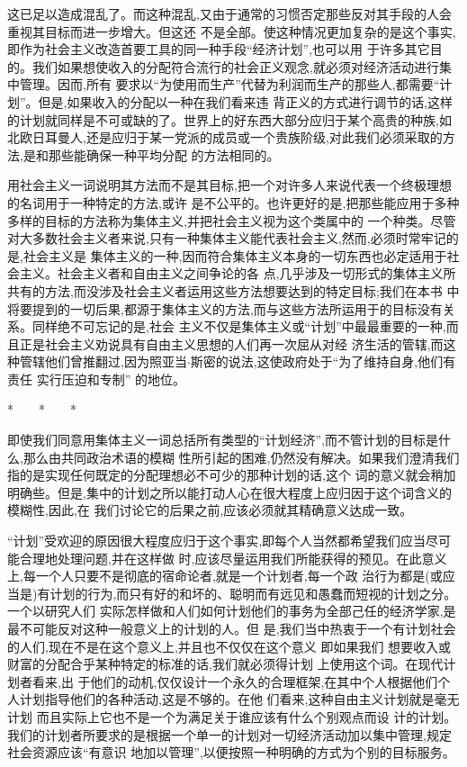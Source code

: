 ﻿\documentclass[12pt]{article}
\begin{document}
这已足以造成混乱了。而这种混乱,又由于通常的习惯否定那些反对其手段的人会重视其目标而进一步增大。但这还
不是全部。使这种情况更加复杂的是这个事实,即作为社会主义改造首要工具的同一种手段``经济计划'',也可以用
于许多其它目的。我们如果想使收入的分配符合流行的社会正义观念,就必须对经济活动进行集中管理。因而,所有
要求以``为使用而生产''代替为利润而生产的那些人,都需要``计划''。但是,如果收入的分配以一种在我们看来违
背正义的方式进行调节的话,这样的计划就同样是不可或缺的了。世界上的好东西大部分应归于某个高贵的种族,如
北欧日耳曼人,还是应归于某一党派的成员或一个贵族阶级,对此我们必须采取的方法,是和那些能确保一种平均分配
的方法相同的。

用社会主义一词说明其方法而不是其目标,把一个对许多人来说代表一个终极理想的名词用于一种特定的方法,或许
是不公平的。也许更好的是,把那些能应用于多种多样的目标的方法称为集体主义,并把社会主义视为这个类属中的
一个种类。尽管对大多数社会主义者来说,只有一种集体主义能代表社会主义,然而,必须时常牢记的是,社会主义是
集体主义的一种,因而符合集体主义本身的一切东西也必定适用于社会主义。社会主义者和自由主义之间争论的各
点,几乎涉及一切形式的集体主义所共有的方法,而没涉及社会主义者运用这些方法想要达到的特定目标;我们在本书
中将要提到的一切后果,都源于集体主义的方法,而与这些方法所运用于的目标没有关系。同样绝不可忘记的是,社会
主义不仅是集体主义或``计划''中最最重要的一种,而且正是社会主义劝说具有自由主义思想的人们再一次屈从对经
济生活的管辖,而这种管辖他们曾推翻过,因为照亚当$\cdot$斯密的说法,这使政府处于``为了维持自身,他们有责任
实行压迫和专制'' 的地位。

*　　*　　*

即使我们同意用集体主义一词总括所有类型的``计划经济'',而不管计划的目标是什么,那么由共同政治术语的模糊
性所引起的困难,仍然没有解决。如果我们澄清我们指的是实现任何既定的分配理想必不可少的那种计划的话,这个
词的意义就会稍加明确些。但是,集中的计划之所以能打动人心在很大程度上应归因于这个词含义的模糊性,因此,在
我们讨论它的后果之前,应该必须就其精确意义达成一致。

``计划''受欢迎的原因很大程度应归于这个事实,即每个人当然都希望我们应当尽可能合理地处理问题,并在这样做
时,应该尽量运用我们所能获得的预见。在此意义上,每一个人只要不是彻底的宿命论者,就是一个计划者,每一个政
治行为都是(或应当是)有计划的行为,而只有好的和坏的、聪明而有远见和愚蠢而短视的计划之分。一个以研究人们
实际怎样做和人们如何计划他们的事务为全部己任的经济学家,是最不可能反对这种一般意义上的计划的人。但
是,我们当中热衷于一个有计划社会的人们,现在不是在这个意义上,并且也不仅仅在这个意义 \myrule 即如果我们
想要收入或财富的分配合乎某种特定的标准的话,我们就必须得计划 \myrule 上使用这个词。在现代计划者看来,出
于他们的动机,仅仅设计一个永久的合理框架,在其中个人根据他们个人计划指导他们的各种活动,这是不够的。在他
们看来,这种自由主义计划就是毫无计划 \myrule 而且实际上它也不是一个为满足关于谁应该有什么个别观点而设
计的计划。我们的计划者所要求的是根据一个单一的计划对一切经济活动加以集中管理,规定社会资源应该``有意识
地加以管理'',以便按照一种明确的方式为个别的目标服务。
\end{document}
